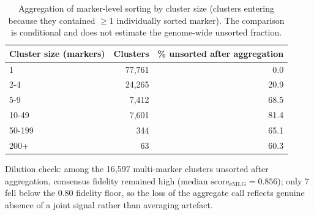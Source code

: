 \begin{table}[htbp]
\centering
\small
\caption{Aggregation of marker-level sorting by cluster size (clusters entering because they contained $\geq1$ individually sorted marker). The comparison is conditional and does not estimate the genome-wide unsorted fraction.}
\label{tab:sizeagg}
\begin{tabular}{l r r}
\toprule
Cluster size (markers) & Clusters & \% unsorted after aggregation \\
\midrule
1 & 77,761 & 0.0 \\
2-4 & 24,265 & 20.9 \\
5-9 & 7,412 & 68.5 \\
10-49 & 7,601 & 81.4 \\
50-199 & 344 & 65.1 \\
200+ & 63 & 60.3 \\
\bottomrule
\end{tabular}
\par\smallskip\footnotesize\raggedright Dilution check: among the 16,597 multi-marker clusters unsorted after aggregation, consensus fidelity remained high (median $\mathrm{score}_{\mathrm{eMLG}}=0.856$); only 7 fell below the 0.80 fidelity floor, so the loss of the aggregate call reflects genuine absence of a joint signal rather than averaging artefact.
\end{table}
